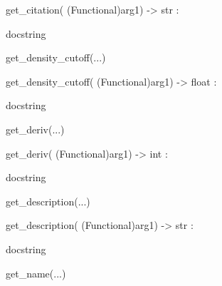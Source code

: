 \documentclass[letterpaper,10pt,english]{sphinxmanual}
\begin{document}
\begin{description}
\begin{description}
\begin{DUlineblock}{0em}
\begin{DUlineblock}{\DUlineblockindent}
\item[] get\_citation( (Functional)arg1) -\textgreater{} str :
\item[]
\begin{DUlineblock}{\DUlineblockindent}
\item[] docstring
\item[] 
\end{DUlineblock}
\end{DUlineblock}
\item[] get\_density\_cutoff(...)
\item[]
\begin{DUlineblock}{\DUlineblockindent}
\item[] get\_density\_cutoff( (Functional)arg1) -\textgreater{} float :
\item[]
\begin{DUlineblock}{\DUlineblockindent}
\item[] docstring
\item[] 
\end{DUlineblock}
\end{DUlineblock}
\item[] get\_deriv(...)
\item[]
\begin{DUlineblock}{\DUlineblockindent}
\item[] get\_deriv( (Functional)arg1) -\textgreater{} int :
\item[]
\begin{DUlineblock}{\DUlineblockindent}
\item[] docstring
\item[] 
\end{DUlineblock}
\end{DUlineblock}
\item[] get\_description(...)
\item[]
\begin{DUlineblock}{\DUlineblockindent}
\item[] get\_description( (Functional)arg1) -\textgreater{} str :
\item[]
\begin{DUlineblock}{\DUlineblockindent}
\item[] docstring
\item[] 
\end{DUlineblock}
\end{DUlineblock}
\item[] get\_name(...)
\item[]
\begin{DUlineblock}{\DUlineblockindent}

\end{DUlineblock}
\end{DUlineblock}
\end{description}
\end{description}
\end{document}
